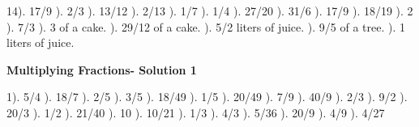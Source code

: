 \documentclass{article}%
\begin{document}
14). 17/9%
). 2/3%
). 13/12%
). 2/13%
). 1/7%
). 1/4%
). 27/20%
). 31/6%
). 17/9%
). 18/19%
). 2%
). 7/3%
). 3 of a cake.%
). 29/12 of a cake.%
). 5/2 liters of juice.%
). 9/5 of a tree.%
). 1 liters of juice.%
\newline%
\newpage%
\large%
\begin{center}%
\textbf{Multiplying Fractions- Solution 1}%
\newline%
\end{center} \normalsize%
1). 5/4%
). 18/7%
). 2/5%
). 3/5%
). 18/49%
). 1/5%
). 20/49%
). 7/9%
). 40/9%
). 2/3%
). 9/2%
). 20/3%
). 1/2%
). 21/40%
). 10%
). 10/21%
). 1/3%
). 4/3%
). 5/36%
). 20/9%
). 4/9%
). 4/27%
\end{document}
